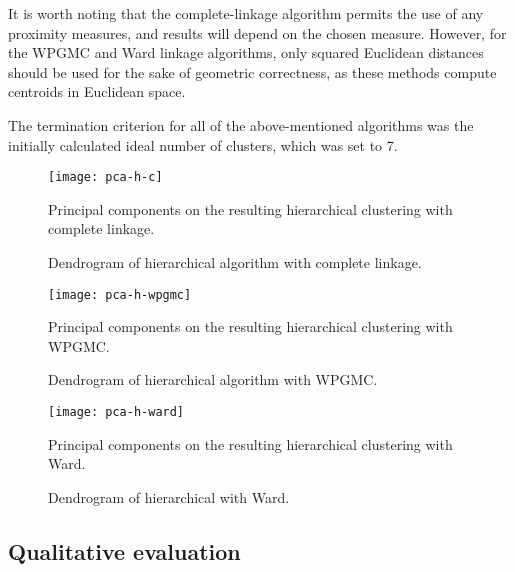 \documentclass[
  course = {{DS12E Clustering Algorithms}},
  quartile = {{2}},
  assignment = ,
  name = {{Michael Darmanis ; Vasilios Venieris}},
  studentnumber = {{7115152200004 ; 7115152200017}},
  email = {{mdarm@di.uoa.gr ; vvenieris@di.uoa.gr}},
  firstexercise = 1
]{aga-homework}
\begin{document}
It is worth noting that the complete-linkage algorithm permits the use of any proximity measures, and results will depend on the chosen measure. However, for the WPGMC and Ward linkage algorithms, only squared Euclidean distances should be used for the sake of geometric correctness, as these methods compute centroids in Euclidean space.

The termination criterion for all of the above-mentioned algorithms was the initially calculated ideal number of clusters, which was set to 7.


\begin{figure}[htbp!]
	\centering
    \texttt{[image: pca-h-c]}
    \caption{Principal components on the resulting hierarchical clustering with complete linkage.}
    \label{fig:h-complete}
\end{figure}

\begin{figure}[htbp!]
  \centering
  \def\svgwidth{.7\linewidth}
  
  \caption{Dendrogram of hierarchical algorithm with complete linkage.}
  \label{fig:h-complete-dendo}
\end{figure}

\begin{figure}[htbp!]
	\centering
    \texttt{[image: pca-h-wpgmc]}
    \caption{Principal components on the resulting hierarchical clustering with WPGMC.}
    \label{fig:h-wpgmc}
\end{figure}

\begin{figure}[htbp!]
  \centering
  \def\svgwidth{.7\linewidth}
  
  \caption{Dendrogram of hierarchical algorithm with WPGMC.}
  \label{fig:h-wpgmc-dendo}
\end{figure}

\begin{figure}[htbp!]
	\centering
    \texttt{[image: pca-h-ward]}
    \caption{Principal components on the resulting hierarchical clustering with Ward.}
    \label{fig:h-ward}
\end{figure}

\begin{figure}[htbp!]
  \centering
  \def\svgwidth{.7\linewidth}
  
  \caption{Dendrogram of hierarchical with Ward.}
  \label{fig:h-ward-dendo}
\end{figure}

\FloatBarrier
\subsection{Qualitative evaluation}
\end{document}
